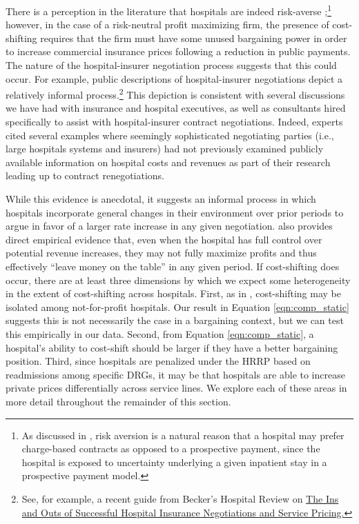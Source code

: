 \documentclass[12pt]{article}
\begin{document}
There is a perception in the literature that hospitals are indeed risk-averse \citep{cooper2015};\footnote{As discussed in \cite{cooper2015}, risk aversion is a natural reason that a hospital may prefer charge-based contracts as opposed to a prospective payment, since the hospital is exposed to uncertainty underlying a given inpatient stay in a prospective payment model.} however, in the case of a risk-neutral profit maximizing firm, the presence of cost-shifting requires that the firm must have some unused bargaining power in order to increase commercial insurance prices following a reduction in public payments. The nature of the hospital-insurer negotiation process suggests that this could occur. For example, public descriptions of hospital-insurer negotiations depict a relatively informal process.\footnote{See, for example, a recent guide from Becker's Hospital Review on \href{https://www.beckershospitalreview.com/finance/the-ins-and-outs-of-successful-hospital-insurance-negotiations-and-service-pricing.html}{The Ins and Outs of Successful Hospital Insurance Negotiations and Service Pricing.}} This depiction is consistent with several discussions we have had with insurance and hospital executives, as well as consultants hired specifically to assist with hospital-insurer contract negotiations. Indeed, experts cited several examples where seemingly sophisticated negotiating parties (i.e., large hospitals systems and insurers) had not previously examined publicly available information on hospital costs and revenues as part of their research leading up to contract renegotiations.

While this evidence is anecdotal, it suggests an informal process in which hospitals incorporate general changes in their environment over prior periods to argue in favor of a larger rate increase in any given negotiation. \cite{sacarny2018} also provides direct empirical evidence that, even when the hospital has full control over potential revenue increases, they may not fully maximize profits and thus effectively ``leave money on the table'' in any given period. If cost-shifting does occur, there are at least three dimensions by which we expect some heterogeneity in the extent of cost-shifting across hospitals. First, as in \cite{dranove1988}, cost-shifting may be isolated among not-for-profit hospitals. Our result in Equation \ref{eqn:comp_static} suggests this is not necessarily the case in a bargaining context, but we can test this empirically in our data. Second, from Equation \ref{eqn:comp_static}, a hospital's ability to cost-shift should be larger if they have a better bargaining position. Third, since hospitals are penalized under the HRRP based on readmissions among specific DRGs, it may be that hospitals are able to increase private prices differentially across service lines. We explore each of these areas in more detail throughout the remainder of this section.
\end{document}
